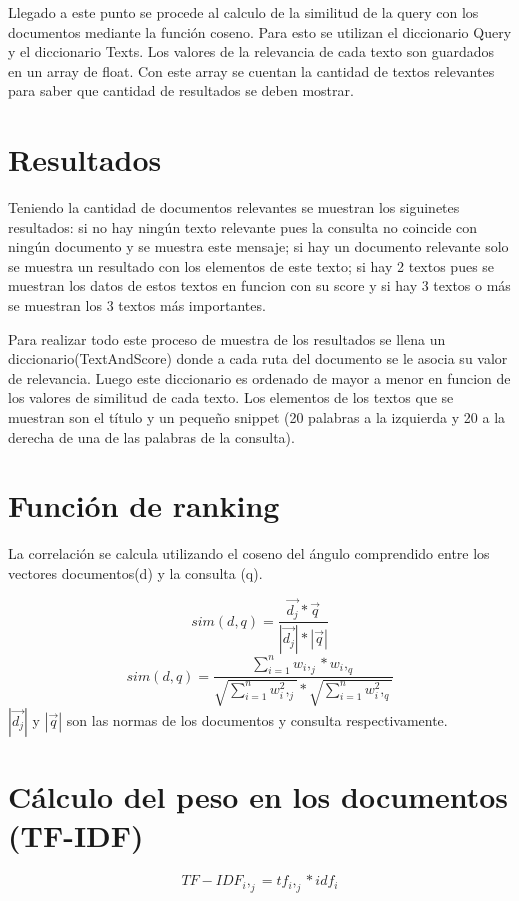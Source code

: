 \documentclass{article}
\begin{document}
Llegado a este punto se procede al calculo de la similitud de la query con los documentos mediante la función coseno. Para esto se utilizan el diccionario Query y el diccionario Texts. Los valores de la relevancia de cada texto son guardados en un array de float. Con este array se cuentan la cantidad de textos relevantes para saber que cantidad de resultados se deben mostrar. 

\section*{Resultados}
Teniendo la cantidad de documentos relevantes se muestran los siguinetes resultados: si no hay ningún texto relevante pues la consulta no coincide con ningún documento y se muestra este mensaje; si hay un documento relevante solo se muestra un resultado con los elementos de este texto; si hay 2 textos pues se muestran los datos de estos textos en funcion con su score y si hay 3 textos o más se muestran los 3 textos más importantes. 

Para realizar todo este proceso de muestra de los resultados se llena un diccionario(TextAndScore) donde a cada ruta del documento se le asocia su valor de relevancia. Luego este diccionario es ordenado de mayor a menor en funcion de los valores de similitud de cada texto. Los elementos de los textos que se muestran son el título y un pequeño snippet (20 palabras a la izquierda y 20 a la derecha de una de las palabras de la consulta).

\section*{Función de ranking}
La correlación se calcula utilizando el coseno del ángulo comprendido entre los vectores documentos(d) y la consulta (q). 

\begin{equation}
sim(d,q) = \frac{\vec{d_j}*\vec{q}}{{|\vec{d_j}|*|\vec{q}|}}
\end{equation}
\begin{equation}
 sim(d,q) = \frac{\sum_{i=1}^{n}w_i,_j*w_i,_q}{\sqrt{\sum_{i=1}^{n}w^2_i,_j}*\sqrt{\sum_{i=1}^{n}w^2_i,_q}}
\end{equation}
$|\vec{d_j}|$ y $|\vec{q}|$ son las normas de los documentos y consulta respectivamente.

\section*{Cálculo del peso en los documentos (TF-IDF)} 
\begin{equation}
  TF-IDF_i,_j = tf_i,_j * idf_i
\end{equation} 
\end{document}
